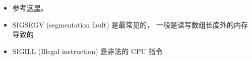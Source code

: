 
\begin{issues}
\issueDraft
\end{issues}

\begin{itemize}
\item 参考\href{https://unix.stackexchange.com/questions/6332/what-causes-various-signals-to-be-sent}{这里}。
\item SIGSEGV (segmentation fault) 是最常见的， 一般是读写数组长度外的内存导致的
\item SIGILL (Illegal instruction) 是非法的 CPU 指令
\end{itemize}
